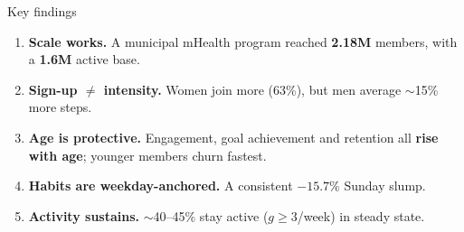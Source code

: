 \documentclass[10pt,aspectratio=169]{beamer}
\newcommand{\hi}[1]{{\color{teal}\bfseries #1}}
\newcommand{\hc}[1]{{\color{coral}\bfseries #1}}
\begin{document}
\begin{frame}{Key findings}
  \begin{enumerate}
    \item \textbf{Scale works.} A municipal mHealth program reached \hi{2.18M} members, with a \hi{1.6M} active base.
    \item \textbf{Sign-up $\neq$ intensity.} Women join more (63\%), but men average $\sim$15\% more steps.
    \item \textbf{Age is protective.} Engagement, goal achievement and retention all \textbf{rise with age}; younger members churn fastest.
    \item \textbf{Habits are weekday-anchored.} A consistent \hc{$-15.7\%$} Sunday slump.
    \item \textbf{Activity sustains.} $\sim$40--45\% stay active ($g\!\ge\!3$/week) in steady state.
  \end{enumerate}
\end{frame}
\end{document}
